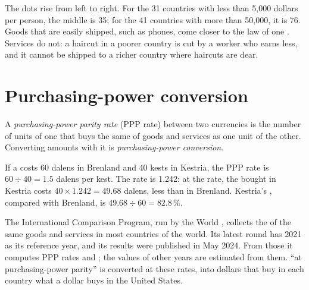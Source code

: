 The dots rise from left to right. For the 31 countries with less than 5,000 dollars per person, the middle
 is 35; for the 41 countries with more than 50,000, it is 76. Goods that are easily shipped,
such as phones, come closer to the law of one . Services do not: a haircut in a poorer country is cut by a worker
who earns less, and it cannot be shipped to a richer country where haircuts are dear.

\section{Purchasing-power conversion}

\begin{definition}\label{def:g9:exchange-rates-and-purchasing-power:ppp}
A \emph{purchasing-power parity rate} (PPP rate) between two currencies
is the number of units of one  that buys the same  of goods and services as one unit of the
other. Converting amounts with it is \emph{purchasing-power conversion}.
\end{definition}

If a  costs 60 dalens in Brenland and 40 kests in Kestria, the PPP rate is $60 \div 40 = 1.5$ dalens
per kest. The  rate is 1.242: at the  rate, the  bought in Kestria costs $40 \times
1.242 = 49.68$ dalens, less than in Brenland. Kestria's , compared with Brenland, is
$49.68 \div 60 = 82.8\,\%$.

\begin{measure}
The International Comparison Program, run by the World , collects the  of the same goods and
services in most countries of the world. Its latest round has 2021 as its reference year, and its results
were published in May 2024. From those  it computes PPP rates and ; the values of other
years are estimated from them.  ``at purchasing-power parity'' is converted at these rates,
into dollars that buy in each country what a dollar buys in the United States.
\end{measure}

